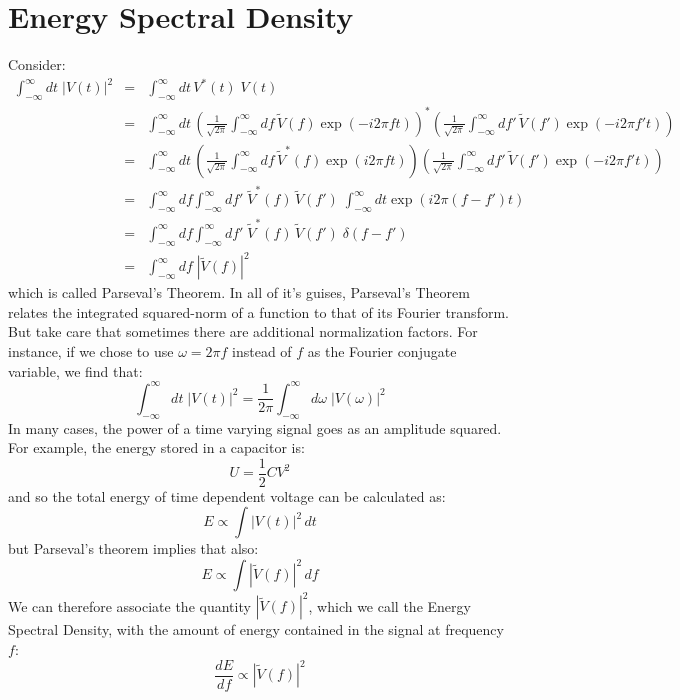 \documentclass[12pt,oneside]{book}
\begin{document}
\section{Energy Spectral Density}
Consider:
\begin{eqnarray*}
\int_{-\infty}^{\infty} dt \; |V(t)|^2 &=&  \int_{-\infty}^{\infty} dt \, V^*(t) \; V(t) \\
&=& \int_{-\infty}^{\infty} dt \, \left( \frac{1}{\sqrt{2\pi}} \int_{-\infty}^{\infty} df \, \widetilde{V}(f) \exp(-i2\pi f t) \right)^*  \left( \frac{1}{\sqrt{2\pi}} \int_{-\infty}^{\infty} df' \, \widetilde{V}(f') \exp(-i2\pi f' t) \right) \\
&=& \int_{-\infty}^{\infty} dt \, \left( \frac{1}{\sqrt{2\pi}} \int_{-\infty}^{\infty} df \, \widetilde{V}^*(f) \exp(i2\pi f t) \right)  \left( \frac{1}{\sqrt{2\pi}} \int_{-\infty}^{\infty} df' \, \widetilde{V}(f') \exp(-i2\pi f' t) \right) \\
&=& \int_{-\infty}^{\infty} df \int_{-\infty}^{\infty} df'  \; \widetilde{V}^*(f) \, \widetilde{V}(f') 
\; \int_{-\infty}^{\infty} dt \exp(i2\pi(f-f')t)\\
&=& \int_{-\infty}^{\infty} df \int_{-\infty}^{\infty} df'  \; \widetilde{V}^*(f) \, \widetilde{V}(f') 
\; \delta(f-f')\\
&=& \int_{-\infty}^{\infty} df \; |\widetilde{V}(f)|^2
\end{eqnarray*}
which is called Parseval's Theorem.  In all of it's guises, Parseval's Theorem relates the integrated squared-norm of a function to that of its Fourier transform.  But take care that sometimes there are additional normalization factors.   For instance, if we chose to use $\omega = 2 \pi f$ instead of $f$ as the Fourier conjugate variable, we find that:
\begin{displaymath}
\int_{-\infty}^{\infty} dt \; |V(t)|^2 = \frac{1}{2\pi}\int_{-\infty}^{\infty} d\omega \; |V(\omega)|^2
\end{displaymath}
In many cases, the power of a time varying signal goes as an amplitude squared.  For example, the energy stored in a capacitor is:
\begin{displaymath}
U = \frac{1}{2} C V^2
\end{displaymath}
and so the total energy of time dependent voltage can be calculated as:
\begin{equation}
E \propto \int |V(t)|^2 \, dt \label{eqn:energy}
\end{equation}
but Parseval's theorem implies that also:
\begin{displaymath}
E \propto \int |\widetilde{V}(f)|^2 \, df
\end{displaymath}
We can therefore associate the quantity $|\widetilde{V}(f)|^2$, which we call the Energy Spectral Density, with the amount of energy contained in the signal at frequency $f$:
\begin{displaymath}
\frac{dE }{df} \propto |\widetilde{V}(f)|^2 
\end{displaymath}
\end{document}
